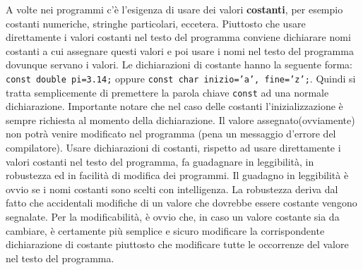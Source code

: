\documentclass[a4paper,12pt]{book}
\begin{document}
A volte nei programmi c'è l'esigenza di usare dei valori \textbf{costanti}, per esempio costanti numeriche, stringhe particolari, eccetera.
Piuttosto che usare direttamente i valori costanti nel testo del programma conviene dichiarare nomi costanti a cui assegnare questi valori e poi usare i nomi nel testo del programma dovunque servano i valori.
Le dichiarazioni di costante hanno la seguente forma: \texttt{const double pi=3.14;} oppure \texttt{const char inizio='a', fine='z';}.
Quindi si tratta semplicemente di premettere la parola chiave \texttt{const} ad una normale dichiarazione.
Importante notare che nel caso delle costanti l'inizializzazione è sempre richiesta al momento della dichiarazione.
Il valore assegnato(ovviamente) non potrà venire modificato nel programma (pena un messaggio d'errore del compilatore).
Usare dichiarazioni di costanti, rispetto ad usare direttamente i valori costanti nel testo del programma, fa guadagnare in leggibilità, in robustezza ed in facilità di modifica dei programmi. Il guadagno in leggibilità è ovvio se i nomi costanti sono scelti con intelligenza.
La robustezza deriva dal fatto che accidentali modifiche di un valore che dovrebbe essere costante vengono segnalate.
Per la modificabilità, è ovvio che, in caso un valore costante sia da cambiare, è certamente più semplice e sicuro modificare la corrispondente dichiarazione di costante piuttosto che modificare tutte le occorrenze del valore nel testo del programma. 
\end{document}
